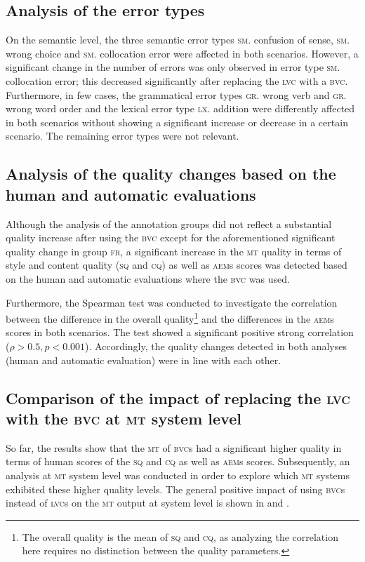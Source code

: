 \documentclass[output=paper]{langsci/langscibook}
\begin{document}
\subsection{Analysis of the error types}
On the semantic level, the three semantic error types \textsc{sm}. confusion of sense, \textsc{sm}. wrong choice and \textsc{sm}. collocation error were affected in both scenarios. However, a significant change in the number of errors was only observed in error type \textsc{sm}. collocation error; this decreased significantly after replacing the \textsc{lvc} with a \textsc{bvc}. Furthermore, in few cases, the grammatical error types \textsc{gr}. wrong verb and \textsc{gr}. wrong word order and the lexical error type \textsc{lx}. addition were differently affected in both scenarios without showing a significant increase or decrease in a certain scenario. The remaining error types were not relevant.

\subsection{Analysis of the quality changes based on the human and automatic evaluations}
Although the analysis of the annotation groups did not reflect a substantial quality increase after using the \textsc{bvc} except for the aforementioned significant quality change in group \textsc{fr}, a significant increase in the \textsc{mt} quality in terms of style and content quality (\textsc{sq} and \textsc{cq}) as well as \textsc{aem}s scores was detected based on the human and automatic evaluations where the \textsc{bvc} was used.



Furthermore, the Spearman test was conducted to investigate the correlation between the difference in the overall quality\footnote{The overall quality is the mean of \textsc{sq} and \textsc{cq}, as analyzing the correlation here requires no distinction between the quality parameters.} and the differences in the \textsc{aem}s scores in both scenarios. The test showed a significant positive strong correlation ($\rho > 0.5, p < 0.001$). Accordingly, the quality changes detected in both analyses (human and automatic evaluation) were in line with each other.



\subsection{Comparison of the impact of replacing the \textsc{lvc} with the \textsc{bvc} at \textsc{mt} system level}
So far, the results show that the \textsc{mt} of \textsc{bvc}s had a significant higher quality in terms of human scores of the \textsc{sq} and \textsc{cq} as well as \textsc{aem}s scores. Subsequently, an analysis at \textsc{mt} system level was conducted in order to explore which \textsc{mt} systems exhibited these higher quality levels. The general positive impact of using \textsc{bvc}s instead of \textsc{lvc}s on the \textsc{mt} output at system level is shown in  and .\largerpage[-1]
\end{document}
